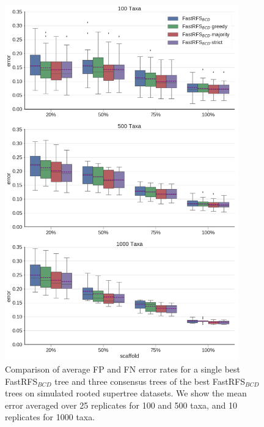 \begin{figure}
  \centering
  \includegraphics[width=0.9\textwidth]{siesta-supp-figs/fastrfs-bcd-consensus-comparison-mult_only}
  \caption[Comparison of  average FP and FN error rates for a single best FastRFS$_{BCD}$ tree and three  consensus trees  on simulated
    rooted supertree datasets.]{Comparison of  average FP and FN error rates for a single best FastRFS$_{BCD}$ tree and three  consensus trees of the best FastRFS$_{BCD}$ trees  on simulated
    rooted supertree datasets. We show the mean error averaged over 25
    replicates for 100 and 500 taxa, and 10 replicates for 1000 taxa.}
  \label{fig:supertree-consensus-comparison-3}
\end{figure}



